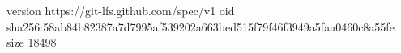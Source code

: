 version https://git-lfs.github.com/spec/v1
oid sha256:58ab84b82387a7d7995af539202a663bed515f79f46f3949a5faa0460c8a55fe
size 18498
